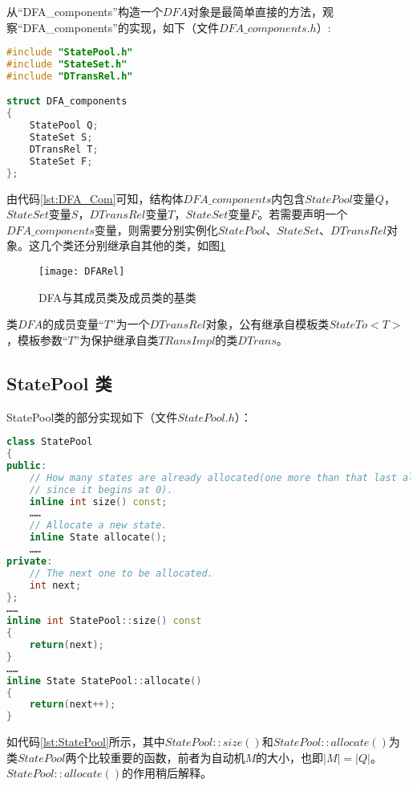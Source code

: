 从“DFA\_components”构造一个$DFA$对象是最简单直接的方法，观察“DFA\_components”的实现，如下（文件$DFA\_ components.h$）:
\lstset{style=mystyle}
\begin{lstlisting}[language=C++,label={lst:DFA_Com},caption={DFA\_components}]
#include "StatePool.h"
#include "StateSet.h"
#include "DTransRel.h"

struct DFA_components
{
    StatePool Q;
    StateSet S;
    DTransRel T;
    StateSet F;
};    
\end{lstlisting}
由代码\ref{lst:DFA_Com}可知，结构体$DFA\_components$内包含$StatePool$变量$Q$，$StateSet$变量$S$，$DTransRel$变量$T$，$StateSet$变量$F$。若需要声明一个$DFA\_components$变量，则需要分别实例化$StatePool$、$StateSet$、$DTransRel$对象。这几个类还分别继承自其他的类，如图\ref{fig:DFARel}

\begin{figure}[!htbp]
    \centering
    \texttt{[image: DFARel]}
    \caption{DFA与其成员类及成员类的基类}
    \label{fig:DFARel}
\end{figure}

类$DFA$的成员变量“$T$”为一个$DTransRel$对象，公有继承自模板类$StateTo<T>$，模板参数“$T$”为保护继承自类$TRansImpl$的类$DTrans$。

\subsection{StatePool 类}
StatePool类的部分实现如下（文件$StatePool.h$）：
\lstset{style=mystyle}
\begin{lstlisting}[language=C++,label={lst:StatePool},caption={StatePool}]
class StatePool
{
public:
    // How many states are already allocated(one more than that last allocated one,
    // since it begins at 0).
    inline int size() const;
    ……
    // Allocate a new state.
    inline State allocate();
    ……
private:
    // The next one to be allocated.
    int next;
};
……
inline int StatePool::size() const
{
    return(next);
}
……
inline State StatePool::allocate()
{
    return(next++);
}
\end{lstlisting}
如代码\ref{lst:StatePool}所示，其中$StatePool::size()$和$StatePool::allocate()$为类$StatePool$两个比较重要的函数，前者为自动机$M$的大小，也即$|M|=|Q|$。$StatePool::allocate()$的作用稍后解释。
